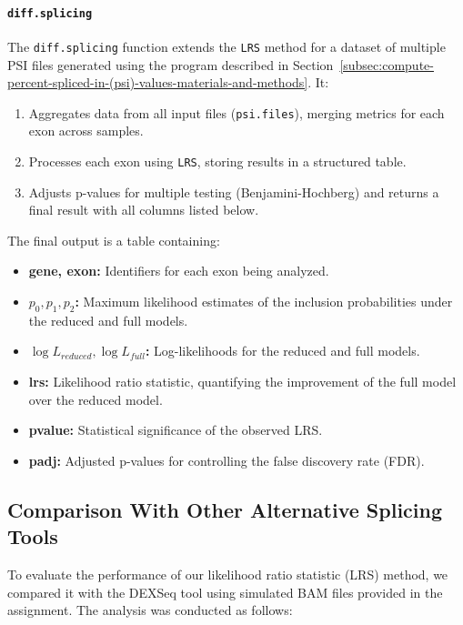 \documentclass{article}
\begin{document}
    \paragraph{\texttt{diff.splicing}}
    The \texttt{diff.splicing} function extends the \texttt{LRS} method for a dataset of multiple PSI files generated using the program described in Section~\ref{subsec:compute-percent-spliced-in-(psi)-values-materials-and-methods}. It:
    \begin{enumerate}
        \item Aggregates data from all input files (\texttt{psi.files}), merging metrics for each exon across samples.
        \item Processes each exon using \texttt{LRS}, storing results in a structured table.
        \item Adjusts p-values for multiple testing (Benjamini-Hochberg) and returns a final result with all columns listed below.
    \end{enumerate}

    The final output is a table containing:
    \begin{itemize}
        \item \textbf{gene, exon:} Identifiers for each exon being analyzed.
        \item \textbf{\( p_0, p_1, p_2 \):} Maximum likelihood estimates of the inclusion probabilities under the reduced and full models.
        \item \textbf{\( \log L_{reduced}, \log L_{full} \):} Log-likelihoods for the reduced and full models.
        \item \textbf{lrs:} Likelihood ratio statistic, quantifying the improvement of the full model over the reduced model.
        \item \textbf{pvalue:} Statistical significance of the observed LRS.
        \item \textbf{padj:} Adjusted p-values for controlling the false discovery rate (FDR).
    \end{itemize}


    \subsection[Alternative Splicing Comparison]{Comparison With Other Alternative Splicing Tools}\label{subsec:comparison-with-other-alternative-splicing-tools-materials-and-methods}
    To evaluate the performance of our likelihood ratio statistic (LRS) method, we compared it with the DEXSeq tool using simulated BAM files provided in the assignment. The analysis was conducted as follows:
\end{document}
